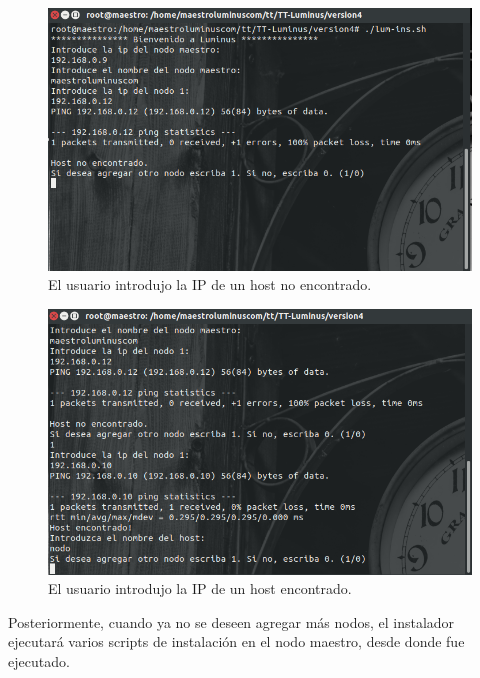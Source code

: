 \begin{figure}[H]
	\hypertarget{fig:hostnoencontrado}{\hspace{1pt}}
	\begin{center}	
		\includegraphics[width=.7\textwidth]{capitulo5/images/hostnoencontrado.png}
		\caption{El usuario introdujo la IP de un host no encontrado.}
	\end{center}
\end{figure}

\begin{figure}[H]
	\hypertarget{fig:hostencontrado}{\hspace{1pt}}
	\begin{center}	
		\includegraphics[width=.7\textwidth]{capitulo5/images/hostencontrado.png}
		\caption{El usuario introdujo la IP de un host encontrado.}
	\end{center}
\end{figure}

Posteriormente, cuando ya no se deseen agregar más nodos, el instalador ejecutará varios scripts de instalación en el nodo maestro, desde donde fue ejecutado.\\

